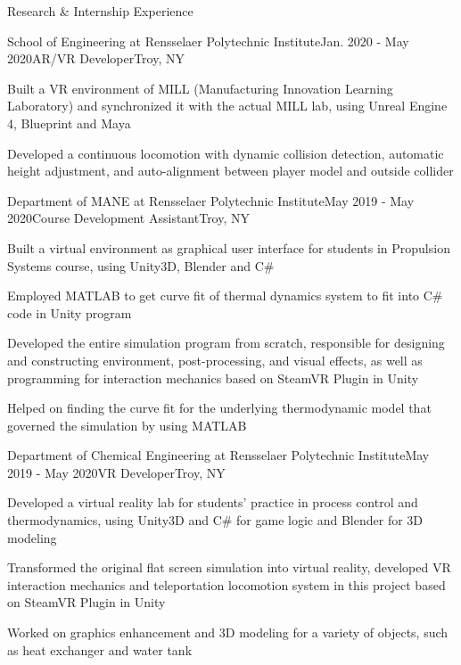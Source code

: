 \documentclass{resume} %
\begin{document}
\begin{rSection}{Research \& Internship Experience}

\begin{rSubsection}{School of Engineering at Rensselaer Polytechnic Institute}{Jan. 2020 - May 2020}{AR/VR Developer}{Troy, NY}
\item Built a VR environment of MILL (Manufacturing Innovation Learning Laboratory) and synchronized it with the actual MILL lab, using Unreal Engine 4, Blueprint and Maya
\item Developed a continuous locomotion with dynamic collision detection, automatic height adjustment, and auto-alignment between player model and outside collider
\end{rSubsection}


\begin{rSubsection}{Department of MANE at Rensselaer Polytechnic Institute}{May 2019 - May 2020}{Course Development Assistant}{Troy, NY}
\item Built a virtual environment as graphical user interface for students in Propulsion Systems course, using Unity3D, Blender and C\#
\item Employed MATLAB to get curve fit of thermal dynamics system to fit into C\# code in Unity program
\item Developed the entire simulation program from scratch, responsible for designing and constructing environment, post-processing, and visual effects, as well as programming for interaction mechanics based on SteamVR Plugin in Unity
\item Helped on finding the curve fit for the underlying thermodynamic model that governed the simulation by using MATLAB
\end{rSubsection}


\begin{rSubsection}{Department of Chemical Engineering at Rensselaer Polytechnic Institute}{May 2019 - May 2020}{VR Developer}{Troy, NY}
\item Developed a virtual reality lab for students’ practice in process control and thermodynamics, using Unity3D and C\# for game logic and Blender for 3D modeling
\item Transformed the original flat screen simulation into virtual reality, developed VR interaction mechanics and teleportation locomotion system in this project based on SteamVR Plugin in Unity
\item Worked on graphics enhancement and 3D modeling for a variety of objects, such as heat exchanger and water tank
\end{rSubsection}


\end{rSection}
\end{document}

